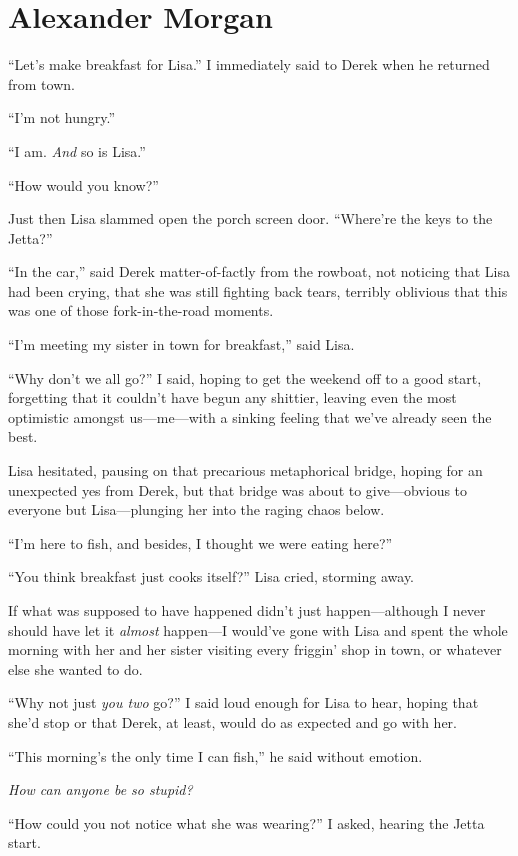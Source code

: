 \chapter{Alexander Morgan}

\titlemark

``Let's make breakfast for Lisa.'' I immediately said to Derek when he
returned from town.

``I'm not hungry.''

``I am. \emph{And} so is Lisa.''

``How would you know?''

Just then Lisa slammed open the porch screen door. ``Where're the keys
to the Jetta?''

``In the car,'' said Derek matter-of-factly from the rowboat, not
noticing that Lisa had been crying, that she was still fighting back
tears, terribly oblivious that this was one of those fork-in-the-road
moments.

``I'm meeting my sister in town for breakfast,'' said Lisa.

``Why don't we all go?'' I said, hoping to get the weekend off to a good
start, forgetting that it couldn't have begun any shittier, leaving even
the most optimistic amongst us---me---with a sinking feeling that we've
already seen the best.

Lisa hesitated, pausing on that precarious metaphorical bridge, hoping
for an unexpected yes from Derek, but that bridge was about to
give---obvious to everyone but Lisa---plunging her into the raging chaos
below.

``I'm here to fish, and besides, I thought we were eating here?''

``You think breakfast just cooks itself?'' Lisa cried, storming away.

If what was supposed to have happened didn't just happen---although I
never should have let it \emph{almost} happen---I would've gone with
Lisa and spent the whole morning with her and her sister visiting every
friggin' shop in town, or whatever else she wanted to do.

``Why not just \emph{you two} go?'' I said loud enough for Lisa to hear,
hoping that she'd stop or that Derek, at least, would do as expected and
go with her.

``This morning's the only time I can fish,'' he said without emotion.

\emph{How can anyone be so stupid?}

``How could you not notice what she was wearing?'' I asked, hearing the
Jetta start.

